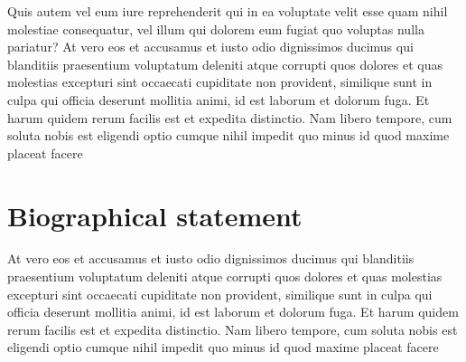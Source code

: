 \documentclass[12pt,english]{article}
\begin{document}
Quis autem vel eum iure reprehenderit qui in ea voluptate velit esse quam nihil molestiae consequatur, vel illum qui dolorem eum fugiat quo voluptas nulla pariatur? At vero eos et accusamus et iusto odio dignissimos ducimus qui blanditiis praesentium voluptatum deleniti atque corrupti quos dolores et quas molestias excepturi sint occaecati cupiditate non provident, similique sunt in culpa qui officia deserunt mollitia animi, id est laborum et dolorum fuga. Et harum quidem rerum facilis est et expedita distinctio. Nam libero tempore, cum soluta nobis est eligendi optio cumque nihil impedit quo minus id quod maxime placeat facere 


\singlespacing




\section*{Biographical statement}

At vero eos et accusamus et iusto odio dignissimos ducimus qui blanditiis praesentium voluptatum deleniti atque corrupti quos dolores et quas molestias excepturi sint occaecati cupiditate non provident, similique sunt in culpa qui officia deserunt mollitia animi, id est laborum et dolorum fuga. Et harum quidem rerum facilis est et expedita distinctio. Nam libero tempore, cum soluta nobis est eligendi optio cumque nihil impedit quo minus id quod maxime placeat facere 
\end{document}
